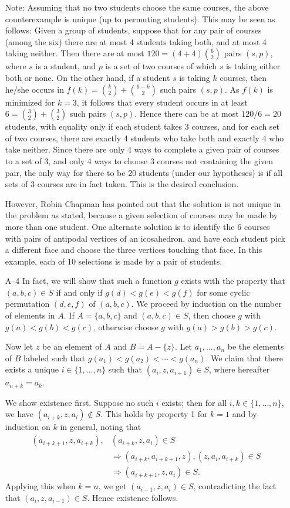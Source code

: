 \documentclass[amssymb,twocolumn,pra,10pt,aps]{revtex4-1}
\begin{document}
\begin{itemize}
Note: Assuming that no two students choose the same courses,
the above counterexample is unique (up to permuting students).
This may be seen as follows: Given a group of students, suppose that
for any pair of courses (among the six) there are at most 4 students
taking both, and at most 4 taking neither.  Then there are at most
$120=(4+4)\binom{6}{2}$ pairs $(s,p)$, where $s$ is a student, and $p$
is a set of two courses of which $s$ is taking either both or none.
On the other hand, if a student $s$ is taking $k$ courses, then he/she
occurs in $f(k)=\binom{k}{2}+\binom{6-k}{2}$ such pairs $(s,p)$.  As
$f(k)$ is minimized for $k=3$, it follows that every student occurs in
at least $6=\binom{3}{2}+\binom{3}{2}$ such pairs $(s,p)$.  Hence
there can be at most $120/6=20$ students, with equality only if each
student takes 3 courses, and for each set of two courses, there are
exactly 4 students who take both and exactly 4 who take neither.
Since there are only 4 ways to complete a given pair of courses to a
set of 3, and only 4 ways to choose 3 courses not containing the given
pair, the only way for there to be 20 students (under our hypotheses)
is if all sets of 3 courses are in fact taken.  This is the desired conclusion.

However, Robin Chapman has pointed out that the solution is not unique
in the problem as stated, because a given selection of courses may be
made by more than one student. One alternate solution is to identify
the 6 courses with pairs of antipodal vertices of an icosahedron, and
have each student pick a different face and choose the three vertices
touching that face. In this example, each of 10 selections is made by
a pair of students.

\item[A--4]
In fact, we will show that such a function $g$ exists with the
property that $(a,b,c) \in S$ if and only if $g(d) < g(e) < g(f)$ for
some cyclic permutation $(d,e,f)$ of $(a,b,c)$. We proceed by
induction on the number of elements in $A$. If $A =
\{a,b,c\}$ and $(a,b,c) \in S$, then choose $g$ with $g(a) < g(b) <
g(c)$, otherwise choose $g$ with $g(a) > g(b) > g(c)$.

Now let $z$ be an element of $A$ and $B = A - \{z\}$.
Let $a_{1}, \dots, a_{n}$ be the elements of $B$ labeled such that
$g(a_{1}) < g(a_{2}) < \cdots < g(a_{n})$. We claim that there exists
a unique $i \in \{1, \dots, n\}$ such that $(a_{i}, z, a_{i+1})
\in S$, where hereafter $a_{n+k} = a_{k}$.

We show existence first. Suppose no such $i$ exists; then for all
$i,k \in \{1, \dots, n\}$, we have $(a_{i+k}, z, a_{i}) \notin S$.
This holds by property 1 for $k=1$ and by induction on $k$ in
general, noting that
\begin{align*}
(a_{i+k+1}, z, a_{i+k}), &(a_{i+k}, z, a_{i})  \in S \\
&\Rightarrow (a_{i+k}, a_{i+k+1}, z), (z, a_{i}, a_{i+k}) \in S \\
&\Rightarrow (a_{i+k+1},z,a_{i}) \in S.
\end{align*}
Applying this when $k=n$, we get $(a_{i-1}, z, a_{i}) \in S$,
contradicting the fact that $(a_{i}, z, a_{i-1}) \in S$. Hence
existence follows.


\end{itemize}
\end{document}
